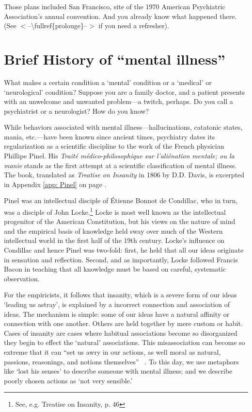 \begin{refsection}
Those plans included San Francisco, site of the 1970 American Psychiatric Association's annual convention. And you already know what happened there. (See $<$--\textbackslash{}fullref\{prolouge\}--$>$ if you need a refresher).

\section{Brief History of ``mental illness''}
\label{briefhistoryofmentalillness}

What makes a certain condition a `mental' condition or a `medical' or `neurological' condition? Suppose you are a family doctor, and a patient presents with an unwelcome and unwanted problem---a twitch, perhaps. Do you call a psychiatrist or a neurologist? How do you know?

While behaviors associated with mental illness---hallucinations, catatonic states, mania, etc.---have been known since ancient times, psychiatry dates its regularization as a scientific discipline to the work of the French physician Phillipe Pinel. His \emph{Traité médico-philosophique sur l'aliénation mentale; ou la manie} stands as the first attempt at a scientific classification of mental illness. The book, translated as \emph{Treatise on Insanity} in 1806 by D.D. Davis, is excerpted in Appendix \ref{app: Pinel} on page \pageref{app: Pinel}. 

Pinel was an intellectual disciple of Étienne Bonnot de Condillac, who in turn, was a disciple of John Locke.\footnote{See, e.g. Treatise on Insanity, p. 46} Locke is most well known as the intellectual progenitor of the American Constitution, but his views on the nature of mind and the empirical basis of knowledge held sway over much of the Western intellectual world in the first half of the 19th century. Locke's influence on Condillac and hence Pinel was two-fold: first, he held that all our ideas originate in sensation and reflection. Second, and as importantly, Locke followed Francis Bacon in teaching that all knowledge must be based on careful, systematic observation.

For the empiricists, it follows that insanity, which is a severe form of our ideas `leading us astray', is explained by a incorrect connection and association of ideas. The mechanism is simple: some of our ideas have a natural affinity or connection with one another. Others are held together by mere custom or habit. Cases of insanity are cases where habitual associations become so disorganized they begin to effect the `natural' associations. This misassociation can become so extreme that it can ``set us awry in our actions, as well moral as natural, passions, reasonings, and notions themselves'' ~\citep[Bk 2, Ch 33, p9. Pg. 531]{Locke:1959wj}. To this day, we use metaphors like `lost his senses' to describe someone with mental illness; and we describe poorly chosen actions as `not very sensible.'


\end{refsection}

